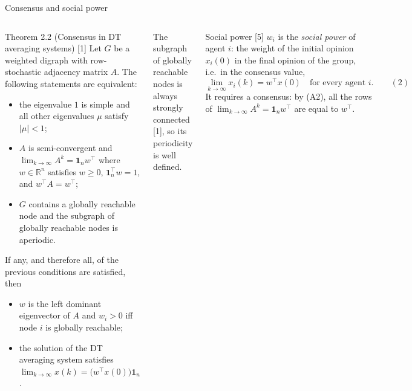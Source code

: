 \documentclass[10pt, aspectratio=169]{beamer}
\newcommand{\compactblocks}{\setbeamerfont{block title}{size=\small}}
\begin{document}
\begin{frame}[label=m-fdg-consensus]{Consensus and social power}
  \compactblocks
  \begin{columns}[T]
      \begin{block}{Theorem 2.2 (Consensus in DT averaging systems) [1]}
        \scriptsize
        Let $G$ be a weighted digraph with row-stochastic adjacency matrix $A$. The
        following statements are equivalent:
        \begin{itemize}
          \item[(A1)] the eigenvalue $1$ is simple and all other eigenvalues $\mu$ satisfy
                      $|\mu| < 1$;
          \item[(A2)] $A$ is semi-convergent and
                      $\lim_{k \to \infty} A^k = \mathbf{1}_n w^\top$ where
                      $w \in \mathbb{R}^n$ satisfies $w \geq 0$,
                      $\mathbf{1}_n^\top w = 1$, and $w^\top A = w^\top$;
          \item[(A3)] $G$ contains a globally reachable node and the subgraph of globally
                      reachable nodes is aperiodic.
        \end{itemize}
        If any, and therefore all, of the previous conditions are satisfied, then
        \begin{itemize}
          \item[(i)]  $w$ is the left dominant eigenvector of $A$ and $w_i > 0$ iff node
                      $i$ is globally reachable;
          \item[(ii)] the solution of the DT averaging system satisfies
                      $\lim_{k \to \infty} x(k) = \big(w^\top x(0)\big)\mathbf{1}_n$.
        \end{itemize}
      \end{block}
      {\tiny The subgraph of globally reachable nodes is always strongly connected [1], so
      its periodicity is well defined.}
      \begin{block}{Social power [5]}
        \scriptsize
        $w_i$ is the \emph{social power} of agent $i$: the weight of the initial opinion
        $x_i(0)$ in the final opinion of the group, i.e.\ in the consensus value,
        \[ \lim_{k \to \infty} x_i(k) = w^\top x(0) \quad \text{for every agent } i.
           \qquad (2) \]
        It requires a consensus: by (A2), all the rows of
        $\lim_{k \to \infty} A^k = \mathbf{1}_n w^\top$ are equal to $w^\top$.

\end{block}
\end{columns}
\end{frame}
\end{document}

